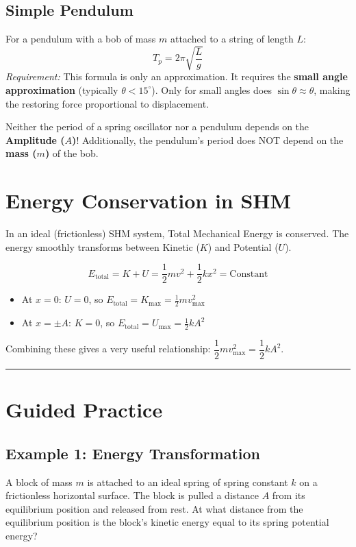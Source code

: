 \documentclass[12pt]{article}
\begin{document}
\subsection{Simple Pendulum}
For a pendulum with a bob of mass $m$ attached to a string of length $L$:
\[ T_p = 2\pi\sqrt{\frac{L}{g}} \]
\textit{Requirement:} This formula is only an approximation. It requires the \textbf{small angle approximation} (typically $\theta < 15^\circ$). Only for small angles does $\sin\theta \approx \theta$, making the restoring force proportional to displacement.

\begin{tcolorbox}[colback=red!5,colframe=red!75!black,title=Warning: Common Trap (AP Favorite)]
Neither the period of a spring oscillator nor a pendulum depends on the \textbf{Amplitude ($A$)}! 
Additionally, the pendulum's period does NOT depend on the \textbf{mass ($m$)} of the bob.
\end{tcolorbox}

\section{Energy Conservation in SHM}

In an ideal (frictionless) SHM system, Total Mechanical Energy is conserved. The energy smoothly transforms between Kinetic ($K$) and Potential ($U$).

\[
E_{\text{total}} = K + U = \frac{1}{2}mv^2 + \frac{1}{2}kx^2 = \text{Constant}
\]

\begin{itemize}
    \item At $x = 0$: $U = 0$, so $E_{\text{total}} = K_{\max} = \frac{1}{2}mv_{\max}^2$
    \item At $x = \pm A$: $K = 0$, so $E_{\text{total}} = U_{\max} = \frac{1}{2}kA^2$ 
\end{itemize}
Combining these gives a very useful relationship: $\dfrac{1}{2}mv_{\max}^2 = \dfrac{1}{2}kA^2$.

\vspace{0.5cm}
\hrule
\vspace{0.5cm}

\section{Guided Practice}

\subsection*{Example 1: Energy Transformation}
A block of mass $m$ is attached to an ideal spring of spring constant $k$ on a frictionless horizontal surface. The block is pulled a distance $A$ from its equilibrium position and released from rest. At what distance from the equilibrium position is the block's kinetic energy equal to its spring potential energy?
\end{document}
